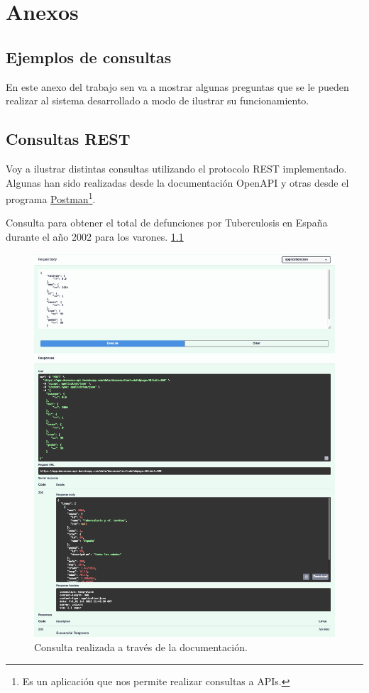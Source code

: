 \chapter{Anexos}

\section{Ejemplos de consultas} 
\label{sec:ejemplos}

En este anexo del trabajo sen va a mostrar algunas preguntas que se le pueden realizar al
sistema desarrollado a modo de ilustrar su
funcionamiento.

\section{Consultas REST}

Voy a ilustrar distintas consultas utilizando el protocolo REST implementado. Algunas han sido realizadas desde la documentación OpenAPI y otras desde el programa \href{https://www.postman.com/}{Postman}\footnote{Es un aplicación que nos permite realizar consultas a APIs.}.

\vskip 0.4in

Consulta para obtener el total de defunciones
por Tuberculosis en España durante el año 2002 para los varones. \ref{fig:1}
\FloatBarrier
\begin{figure}[h]
	\centering
	\includegraphics[width=\textwidth]{doc/logos/imgs/ejemplo1.png}
	\caption{ Consulta realizada a través de la documentación. }
	\label{fig:1}
\end{figure}
\FloatBarrier

